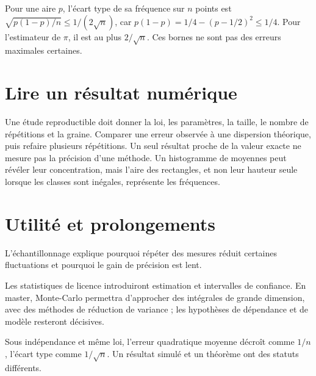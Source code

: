 \documentclass[../cours_1re.tex]{subfiles}
\begin{document}
Pour une aire $p$, l'écart type de sa fréquence sur $n$ points est
$\sqrt{p(1-p)/n}\le1/(2\sqrt n)$, car
$p(1-p)=1/4-(p-1/2)^2\le1/4$.
Pour l'estimateur de $\pi$, il est au plus $2/\sqrt n$.
Ces bornes ne sont pas des erreurs maximales certaines.

\begin{finchapitre}
\section{Lire un résultat numérique}
Une étude reproductible doit donner la loi, les paramètres, la taille,
le nombre de répétitions et la graine. Comparer une erreur observée à une
dispersion théorique, puis refaire plusieurs répétitions.
Un seul résultat proche de la valeur exacte ne mesure pas la précision d'une méthode.
Un histogramme de moyennes peut révéler leur concentration, mais l'aire des
rectangles, et non leur hauteur seule lorsque les classes sont inégales,
représente les fréquences.


\section{Utilité et prolongements}
L'échantillonnage explique pourquoi répéter des mesures réduit certaines
fluctuations et pourquoi le gain de précision est lent.

Les statistiques de licence introduiront estimation et intervalles de confiance.
En master, Monte-Carlo permettra d'approcher des intégrales de grande dimension,
avec des méthodes de réduction de variance ; les hypothèses de dépendance
et de modèle resteront décisives.
\begin{retenir}
Sous indépendance et même loi, l'erreur quadratique moyenne décroît
comme $1/n$, l'écart type comme $1/\sqrt n$. Un résultat simulé et un théorème ont des statuts différents.
\end{retenir}
\end{finchapitre}
\end{document}
